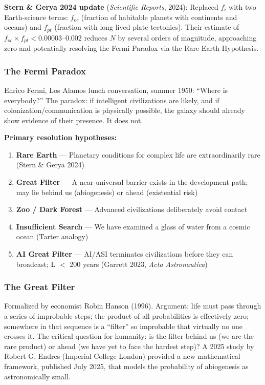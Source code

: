 \documentclass[11pt,letterpaper]{article}
\begin{document}
\textbf{Stern \& Gerya 2024 update} (\textit{Scientific Reports}, 2024): Replaced $f_i$ with two Earth-science terms: $f_{oc}$ (fraction of habitable planets with continents and oceans) and $f_{pt}$ (fraction with long-lived plate tectonics). Their estimate of $f_{oc} \times f_{pt} < 0.00003$--$0.002$ reduces $N$ by several orders of magnitude, approaching zero and potentially resolving the Fermi Paradox via the Rare Earth Hypothesis.

\subsubsection{The Fermi Paradox}

Enrico Fermi, Los Alamos lunch conversation, summer 1950: ``Where is everybody?'' The paradox: if intelligent civilizations are likely, and if colonization/communication is physically possible, the galaxy should already show evidence of their presence. It does not.

\textbf{Primary resolution hypotheses:}
\begin{enumerate}[leftmargin=1.5em]
  \item \textbf{Rare Earth} --- Planetary conditions for complex life are extraordinarily rare (Stern \& Gerya 2024)
  \item \textbf{Great Filter} --- A near-universal barrier exists in the development path; may lie behind us (abiogenesis) or ahead (existential risk)
  \item \textbf{Zoo / Dark Forest} --- Advanced civilizations deliberately avoid contact
  \item \textbf{Insufficient Search} --- We have examined a glass of water from a cosmic ocean (Tarter analogy)
  \item \textbf{AI Great Filter} --- AI/ASI terminates civilizations before they can broadcast; L $<$ 200 years (Garrett 2023, \textit{Acta Astronautica})
\end{enumerate}

\subsubsection{The Great Filter}

Formalized by economist Robin Hanson (1996). Argument: life must pass through a series of improbable steps; the product of all probabilities is effectively zero; somewhere in that sequence is a ``filter'' so improbable that virtually no one crosses it. The critical question for humanity: is the filter behind us (we are the rare product) or ahead (we have yet to face the hardest step)? A 2025 study by Robert G. Endres (Imperial College London) provided a new mathematical framework, published July 2025, that models the probability of abiogenesis as astronomically small.
\end{document}
